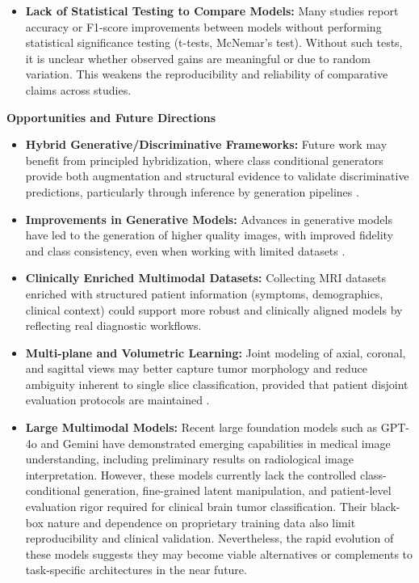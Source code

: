 \begin{itemize}
    
    \item \textbf{Lack of Statistical Testing to Compare Models:} 
    Many studies report accuracy or F1-score improvements between models without performing statistical significance testing (t-tests, McNemar's test). Without such tests, it is unclear whether observed gains are meaningful or due to random variation. This weakens the reproducibility and reliability of comparative claims across studies.
\end{itemize}


\textbf{Opportunities and Future Directions}

\begin{itemize}
    \item \textbf{Hybrid Generative/Discriminative Frameworks:} 
    Future work may benefit from principled hybridization, where class conditional generators provide both augmentation and structural evidence to validate discriminative predictions, particularly through inference by generation pipelines \cite{Fetty2020,pakdelmoez2024controllableretinalimagesynthesis}. 
    
\item \textbf{Improvements in Generative Models:} 
Advances in generative models have led to the generation of higher quality images, with improved fidelity and class consistency, even when working with limited datasets \cite{oeldorf2019loganv2conditionalstylebasedlogo,dobler2022artcreationmulticonditionalstylegans,pakdelmoez2024controllableretinalimagesynthesis}. 

    \item \textbf{Clinically Enriched Multimodal Datasets:} 
    Collecting MRI datasets enriched with structured patient information (symptoms, demographics, clinical context) could support more robust and clinically aligned models by reflecting real diagnostic workflows. 
    
    \item \textbf{Multi-plane and Volumetric Learning:}
    Joint modeling of axial, coronal, and sagittal views may better capture tumor morphology and reduce ambiguity inherent to single slice classification, provided that patient disjoint evaluation protocols are maintained \cite{bharathraj2025implementation3dcnn,ahmed2024vitgru}.

    \item \textbf{Large Multimodal Models:}
    Recent large foundation models such as GPT-4o and Gemini have demonstrated emerging capabilities in medical image understanding, including preliminary results on radiological image interpretation. However, these models currently lack the controlled class-conditional generation, fine-grained latent manipulation, and patient-level evaluation rigor required for clinical brain tumor classification. Their black-box nature and dependence on proprietary training data also limit reproducibility and clinical validation. Nevertheless, the rapid evolution of these models suggests they may become viable alternatives or complements to task-specific architectures in the near future.

\end{itemize}

